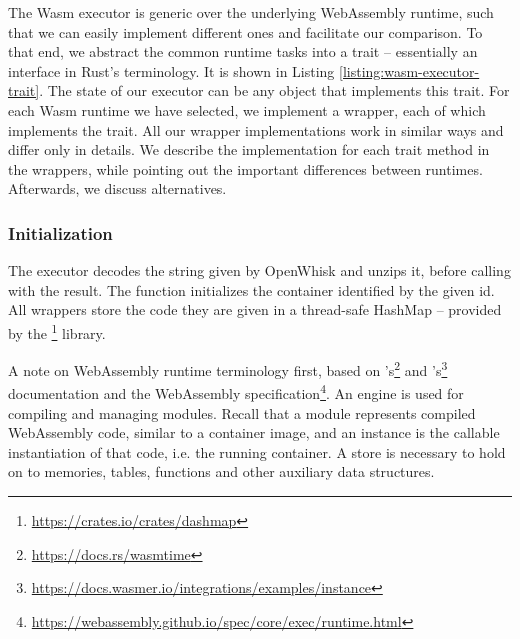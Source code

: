 The Wasm executor is generic over the underlying WebAssembly runtime, such that we can easily implement different ones and facilitate our comparison. To that end, we abstract the common runtime tasks into a trait -- essentially an interface in Rust's terminology. It is shown in Listing \ref{listing:wasm-executor-trait}. The state of our executor can be any object that implements this trait. For each Wasm runtime we have selected, we implement a wrapper, each of which implements the  trait. All our wrapper implementations work in similar ways and differ only in details. We describe the implementation for each trait method in the wrappers, while pointing out the important differences between runtimes. Afterwards, we discuss alternatives.

\subsubsection{Initialization}
The executor decodes the  string given by OpenWhisk and unzips it, before calling  with the result. The function initializes the container identified by the given id. All wrappers store the code they are given in a thread-safe HashMap -- provided by the \footnote{\url{https://crates.io/crates/dashmap}} library.

A note on WebAssembly runtime terminology first, based on 's\footnote{\url{https://docs.rs/wasmtime}} and 's\footnote{\url{https://docs.wasmer.io/integrations/examples/instance}} documentation and the WebAssembly specification\footnote{\url{https://webassembly.github.io/spec/core/exec/runtime.html}}. An engine is used for compiling and managing modules. Recall that a module represents compiled WebAssembly code, similar to a container image, and an instance is the callable instantiation of that code, i.e. the running container. A store is necessary to hold on to memories, tables, functions and other auxiliary data structures.

